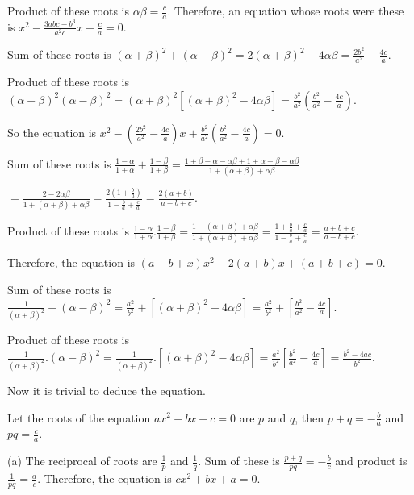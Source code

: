     Product of these roots is $\alpha\beta = \frac{c}{a}$. Therefore, an equation whose roots were these is
    $x^2 - \frac{3abc - b^3}{a^2c}x + \frac{c}{a} = 0$.
  \item Sum of these roots is $(\alpha + \beta)^2 + (\alpha - \beta)^2 = 2(\alpha + \beta)^2 -
    4\alpha\beta = \frac{2b^2}{a^2} - \frac{4c}{a}$.

    Product of these roots is $(\alpha + \beta)^2(\alpha - \beta)^2 = (\alpha + \beta)^2[(\alpha +
      \beta)^2 - 4\alpha\beta] = \frac{b^2}{a^2}\left(\frac{b^2}{a^2} - \frac{4c}{a}\right)$.

    So the equation is $x^2 -\left(\frac{2b^2}{a^2} - \frac{4c}{a}\right)x +
    \frac{b^2}{a^2}\left(\frac{b^2}{a^2} - \frac{4c}{a}\right) = 0$.
  \item Sum of these roots is $\frac{1 - \alpha}{1 + \alpha} + \frac{1 - \beta}{1 + \beta} = \frac{1 +
    \beta - \alpha -\alpha\beta + 1 + \alpha - \beta -\alpha\beta}{1 + (\alpha + \beta) + \alpha\beta}$

    $= \frac{2 - 2\alpha\beta}{1 + (\alpha + \beta) + \alpha\beta} = \frac{2\left(1 +
    \frac{b}{a}\right)}{1 - \frac{b}{a} + \frac{c}{a}} = \frac{2(a + b)}{a - b + c}$.

    Product of these roots is $\frac{1 - \alpha}{1 + \alpha}.\frac{1 - \beta}{1 + \beta} = \frac{1
      -(\alpha + \beta) + \alpha\beta}{1 + (\alpha + \beta) + \alpha\beta} = \frac{1 + \frac{b}{a} +
      \frac{c}{a}}{1 - \frac{b}{a} + \frac{c}{a}} = \frac{a + b + c}{a - b + c}$.

    Therefore, the equation is $(a - b + x)x^2 - 2(a + b)x + (a + b + c) = 0$.
  \item Sum of these roots is $\frac{1}{(\alpha + \beta)^2} + (\alpha - \beta)^2 = \frac{a^2}{b^2} +
    [(\alpha + \beta)^2 - 4\alpha\beta] = \frac{a^2}{b^2} + \left[\frac{b^2}{a^2} - \frac{4c}{a}\right]$.

    Product of these roots is $\frac{1}{(\alpha + \beta)^2}.(\alpha - \beta)^2 = \frac{1}{(\alpha +
      \beta)^2}.[(\alpha + \beta)^2 - 4\alpha\beta] = \frac{a^2}{b^2}\left[\frac{b^2}{a^2} -
      \frac{4c}{a}\right] = \frac{b^2 - 4ac}{b^2}$.

    Now it is trivial to deduce the equation.
  \stopitemize
\item Let the roots of the equation $ax^2 + bx + c = 0$ are $p$ and $q$, then $p + q = -\frac{b}{a}$ and $pq
  = \frac{c}{a}$.

  (a) The reciprocal of roots are $\frac{1}{p}$ and $\frac{1}{q}$. Sum of these is $\frac{p + q}{pq} =
  -\frac{b}{c}$ and product is $\frac{1}{pq} = \frac{a}{c}$. Therefore, the equation is $cx^2 + bx + a = 0$.

